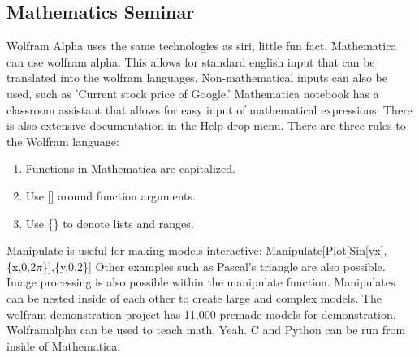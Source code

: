 \documentclass[crop=false,class=book]{standalone}
\begin{document}
\subsection{Mathematics Seminar}
Wolfram Alpha uses the same technologies as siri, little fun fact. Mathematica can use wolfram alpha. This allows for standard english input that can be translated into the wolfram languages.
Non-mathematical inputs can also be used, such as 'Current stock price of Google.'
Mathematica notebook has a classroom assistant that allows for easy input of mathematical expressions. There is also extensive documentation in the Help drop menu. There are three rules to the Wolfram language:
\begin{enumerate}
    \item Functions in Mathematica are capitalized.
    \item Use [] around function arguments.
    \item Use \{\} to denote lists and ranges.
\end{enumerate}
Manipulate is useful for making models interactive: Manipulate[Plot[Sin[yx],\{x,0,2$\pi$\}],\{y,0,2\}]
Other examples such as Pascal's triangle are also possible. Image processing is also possible within the manipulate function. Manipulates can be nested inside of each other to create large and complex models. The wolfram demonstration project has 11,000 premade models for demonstration. Wolframalpha can be used to teach math. Yeah.
C and Python can be run from inside of Mathematica.
\end{document}
